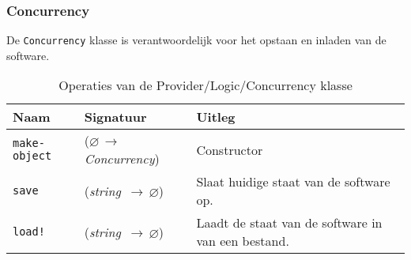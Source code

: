 \documentclass[a4paper, 11pt]{article}
\newcommand{\naar}{\,$\rightarrow$\,}
\renewcommand{\empty}{$\varnothing$}
\newcommand{\<}{\scriptsize\textless\normalsize}
\renewcommand{\>}{\scriptsize\textgreater\normalsize}
\begin{document}
\subsubsection{Concurrency} %
De \texttt{Concurrency} klasse is verantwoordelijk voor het opstaan en inladen van de software.
\begin{table}[H]
	\begin{center}
		\begin{tabular}{|l l l|}
			\hline
			\textbf{Naam} & \textbf{Signatuur} & \textbf{Uitleg}\\
			\hline
			\texttt{make-object} & (\empty \naar \textit{Concurrency}) & Constructor\\
			\hline
			\texttt{save} & (\textit{string} \naar \empty) & Slaat huidige staat van de software op.\\
			\texttt{load!} & (\textit{string} \naar \empty) & Laadt de staat van de software in van een bestand.\\
			\hline
		\end{tabular}
		\caption{Operaties van de Provider/Logic/Concurrency klasse}
	\end{center}
\end{table}

\label{lastpage}
\end{document}
